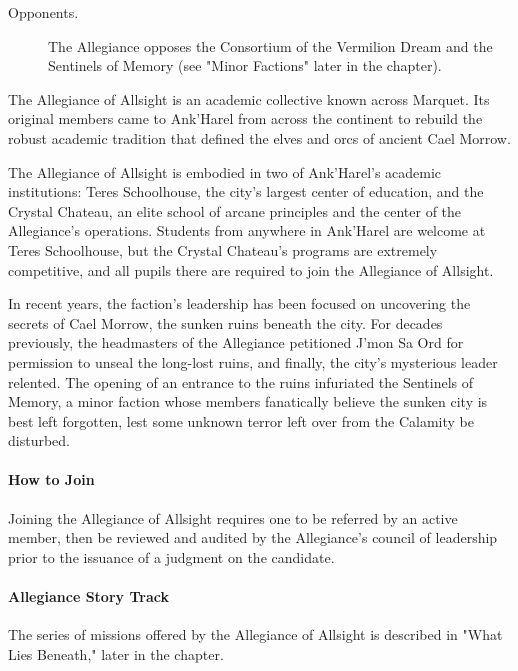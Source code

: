 \documentclass[letterpaper, 11pt, bg=full, twocolumn]{dndbook}
\begin{document}

\begin{description}
\item[Opponents.] The Allegiance opposes the Consortium of the Vermilion Dream and the Sentinels of Memory (see "Minor Factions" later in the chapter).
\end{description}

The Allegiance of Allsight is an academic collective known across Marquet. Its original members came to Ank'Harel from across the continent to rebuild the robust academic tradition that defined the elves and orcs of ancient Cael Morrow.

The Allegiance of Allsight is embodied in two of Ank'Harel's academic institutions: Teres Schoolhouse, the city's largest center of education, and the Crystal Chateau, an elite school of arcane principles and the center of the Allegiance's operations. Students from anywhere in Ank'Harel are welcome at Teres Schoolhouse, but the Crystal Chateau's programs are extremely competitive, and all pupils there are required to join the Allegiance of Allsight.

In recent years, the faction's leadership has been focused on uncovering the secrets of Cael Morrow, the sunken ruins beneath the city. For decades previously, the headmasters of the Allegiance petitioned J'mon Sa Ord for permission to unseal the long-lost ruins, and finally, the city's mysterious leader relented. The opening of an entrance to the ruins infuriated the Sentinels of Memory, a minor faction whose members fanatically believe the sunken city is best left forgotten, lest some unknown terror left over from the Calamity be disturbed.

\paragraph{How to Join}

Joining the Allegiance of Allsight requires one to be referred by an active member, then be reviewed and audited by the Allegiance's council of leadership prior to the issuance of a judgment on the candidate.

\paragraph{Allegiance Story Track}

The series of missions offered by the Allegiance of Allsight is described in "What Lies Beneath," later in the chapter.
\end{document}
